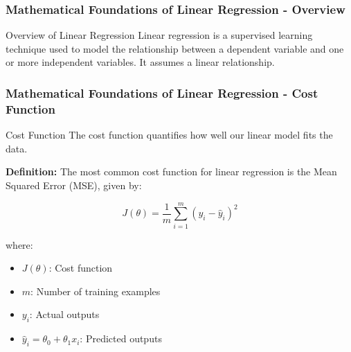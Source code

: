 \documentclass[aspectratio=169]{beamer}
\begin{document}
\begin{frame}[fragile]
    \frametitle{Mathematical Foundations of Linear Regression - Overview}
    
    \begin{block}{Overview of Linear Regression}
        Linear regression is a supervised learning technique used to model the relationship between a dependent variable and one or more independent variables. It assumes a linear relationship.
    \end{block}
    
\end{frame}

\begin{frame}[fragile]
    \frametitle{Mathematical Foundations of Linear Regression - Cost Function}
    
    \begin{block}{Cost Function}
        The cost function quantifies how well our linear model fits the data. 
        
        \textbf{Definition:} The most common cost function for linear regression is the Mean Squared Error (MSE), given by:
        
        \begin{equation}
            J(\theta) = \frac{1}{m} \sum_{i=1}^{m} (y_i - \hat{y}_i)^2
        \end{equation}
        
        where:
        \begin{itemize}
            \item \( J(\theta) \): Cost function
            \item \( m \): Number of training examples
            \item \( y_i \): Actual outputs
            \item \( \hat{y}_i = \theta_0 + \theta_1 x_i \): Predicted outputs
        \end{itemize}
    \end{block}

\end{frame}
\end{document}
